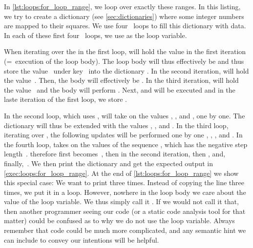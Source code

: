 In \cref{lst:loops:for_loop_range}, we loop over exactly these ranges.
In this listing, we try to create a dictionary (see \cref{sec:dictionaries}) where some integer numbers are mapped to their squares.
We use four ~loops to fill this dictionary with data.
In each of these first four ~loops, we use  as the loop variable.

When iterating over the  in the first loop,  will hold the value  in the first iteration (=~execution of the loop body).
The loop body  will thus effectively be  and thus store the value~ under key~ into the dictionary .
In the second iteration,  will hold the value~.
Then, the body  will effectively be .
In the third iteration,  will hold the value~ and the body will perform .
Next,  and  will be executed and in the laste iteration of the first loop, we store .

In the second loop, which uses ,  will take on the values , , and , one by one.
The dictionary  will thus be extended with the values , , and .
In the third loop, iterating over , the following updates will be performed one by one , , , and .
In the fourth loop,  takes on the values of the sequence , which has the negative step length~.
 therefore first becomes~, then  in the second iteration, then , and, finally,~.
We then print the dictionary and get the expected output in \cref{exec:loops:for_loop_range}.%
%
%
%
At the end of \cref{lst:loops:for_loop_range} we show this special case:
We want to print  three times.
Instead of copying the line  three times, we put it in a loop.
However, nowhere in the loop body we care about the value of the loop variable.
We thus simply call it \pythonil{_}\pythonIdx{\_}.
If we would not call it that, then another programmer seeing our code (or a static code analysis tool for that matter) could be confused as to why we do not use the loop variable.
Always remember that  code could be much more complicated, and any semantic hint we can include to convey our intentions will be helpful.

